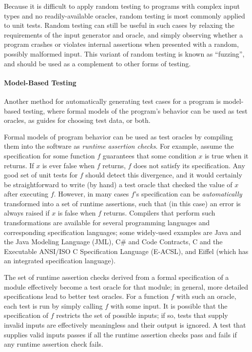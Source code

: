 Because it is difficult to apply random testing to programs with
complex input types and no readily-available oracles, random testing
is most commonly applied to unit tests. Random testing can still be
useful in such cases by relaxing the requirements of the input
generator and oracle, and simply observing whether a program crashes
or violates internal assertions when presented with a random, possibly
malformed input. This variant of random testing is known as
``fuzzing'', and should be used as a complement to other forms of
testing.

\paragraph{Model-Based Testing}

Another method for automatically generating test cases for a program
is model-based testing, where formal models of the program's behavior
can be used as test oracles, as guides for choosing test data, or
both.

Formal models of program behavior can be used as test oracles by
compiling them into the software as \emph{runtime assertion
  checks}. For example, assume the specification for some function $f$
guarantees that some condition $x$ is true when it returns. If $x$ is
ever false when $f$ returns, $f$ does not satisfy its
specification. Any good set of unit tests for $f$ should detect this
divergence, and it would certainly be straightforward to write (by
hand) a test oracle that checked the value of $x$ after executing
$f$. However, in many cases $f$'s specification can be
\emph{automatically} transformed into a set of runtime assertions,
such that (in this case) an error is always raised if $x$ is false
when $f$ returns.  Compilers that perform such transformations are
available for several programming languages and corresponding
specification languages; some widely-used examples are Java and the
Java Modeling Language (JML), C\# and Code Contracts, C and the
Executable ANSI/ISO C Specification Language (E-ACSL), and Eiffel
(which has an integrated specification language).

The set of runtime assertion checks derived from a formal
specification of a module effectively become a test oracle for that
module; in general, more detailed specifications lead to better test
oracles. For a function $f$ with such an oracle, each test is run by
simply calling $f$ with some input. It is possible that the
specification of $f$ restricts the set of possible inputs; if so,
tests that supply invalid inputs are effectively meaningless and their
output is ignored. A test that supplies valid inputs passes if all the
runtime assertion checks pass and fails if any runtime assertion check
fails. 


